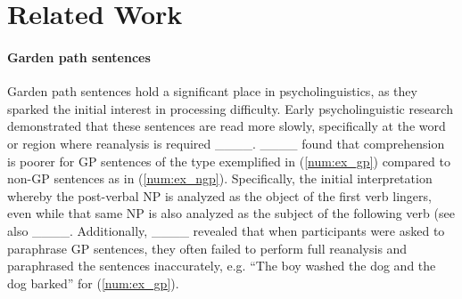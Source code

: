 \section{Related Work}





\paragraph{Garden path sentences} Garden path sentences hold a significant place in psycholinguistics, as they sparked the initial interest in processing difficulty. Early psycholinguistic research demonstrated that these sentences are read more slowly, specifically at the word or region where reanalysis is required ____. ____ found that  comprehension is poorer for GP sentences of the type exemplified in (\ref{num:ex_gp}) compared to non-GP sentences as in (\ref{num:ex_ngp}). Specifically, the initial interpretation whereby the post-verbal NP is analyzed as the object of the first verb lingers, even while that same NP is also analyzed as the subject of the following verb (see also ____. Additionally, ____ revealed that when participants were asked to paraphrase GP sentences, they often failed to perform full reanalysis and paraphrased the sentences inaccurately, e.g. ``The boy washed the dog and the dog barked'' for (\ref{num:ex_gp}). 

